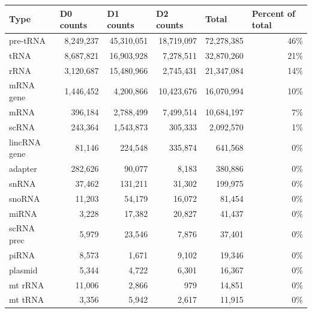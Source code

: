 \documentclass[12pt]{rockefeller}
\begin{document}
\begin{table}[!ht]
  \begin{adjustbox}{max width = \textwidth}

  \begin{tabular}{|l|r|r|r|r|r|}
\hline
              Type &  \multicolumn{1}{l|}{D0 counts} &  \multicolumn{1}{l|}{D1 counts} &  \multicolumn{1}{l|}{D2 counts} &  \multicolumn{1}{l|}{Total} & \multicolumn{1}{l|}{Percent of total} \\
\hline  
       pre-tRNA &  8,249,237 &  45,310,051 &  18,719,097 &  72,278,385 &              46\% \\
            tRNA &  8,687,821 &  16,903,928 &   7,278,511 &  32,870,260 &              21\% \\
            rRNA &  3,120,687 &  15,480,966 &   2,745,431 &  21,347,084 &              14\% \\
       mRNA gene &  1,446,452 &   4,200,866 &  10,423,676 &  16,070,994 &              10\% \\
            mRNA &    396,184 &   2,788,499 &   7,499,514 &  10,684,197 &               7\% \\
           scRNA &    243,364 &   1,543,873 &     305,333 &   2,092,570 &               1\% \\
    lincRNA gene &     81,146 &     224,548 &     335,874 &     641,568 &               0\% \\
         adapter &    282,626 &      90,077 &       8,183 &     380,886 &               0\% \\
           snRNA &     37,462 &     131,211 &      31,302 &     199,975 &               0\% \\
          snoRNA &     11,203 &      54,179 &      16,072 &      81,454 &               0\% \\
           miRNA &      3,228 &      17,382 &      20,827 &      41,437 &               0\% \\
      scRNA prec &      5,979 &      23,546 &       7,876 &      37,401 &               0\% \\
           piRNA &      8,573 &       1,671 &       9,102 &      19,346 &               0\% \\
         plasmid &      5,344 &       4,722 &       6,301 &      16,367 &               0\% \\
         mt rRNA &     11,006 &       2,866 &         979 &      14,851 &               0\% \\
         mt tRNA &      3,356 &       5,942 &       2,617 &      11,915 &               0\% \\

\end{tabular}
\end{adjustbox}
\end{table}
\end{document}
